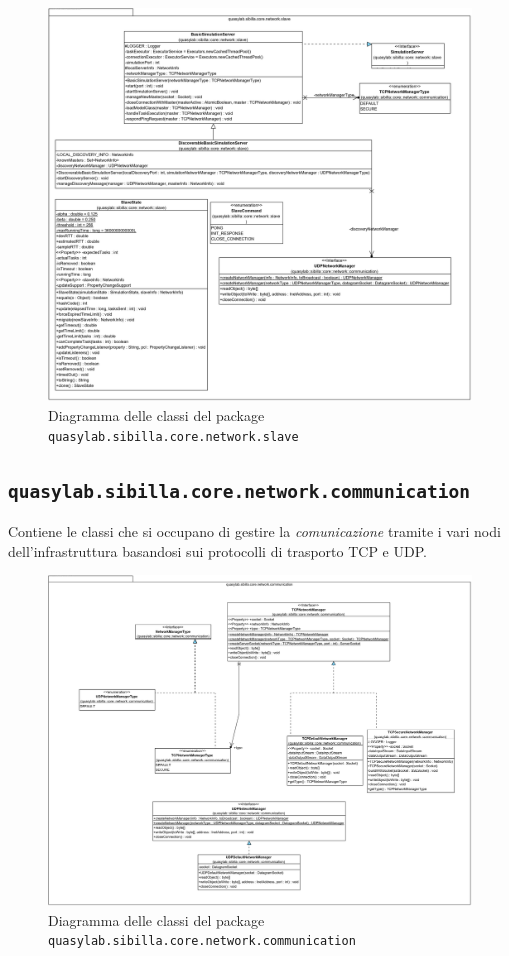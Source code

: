 \begin{figure}[H]
    \includegraphics[width=\linewidth]{images/quasylab.sibilla.core.network.slave.png}
    \captionsetup{justification=centering}
    \caption{Diagramma delle classi del package \texttt{quasylab.sibilla.core.network.slave}}
  \end{figure}

\subsection{\texttt{quasylab.sibilla.core.network.communication}} Contiene le classi che si occupano di gestire la \emph{comunicazione} tramite i vari nodi dell’infrastruttura basandosi sui protocolli di trasporto TCP e UDP. 

\begin{figure}[H]
    \includegraphics[width=\linewidth]{images/quasylab.sibilla.core.network.communication.png}
    \captionsetup{justification=centering}
    \caption{Diagramma delle classi del package \texttt{quasylab.sibilla.core.network.communication}}
  \end{figure}

